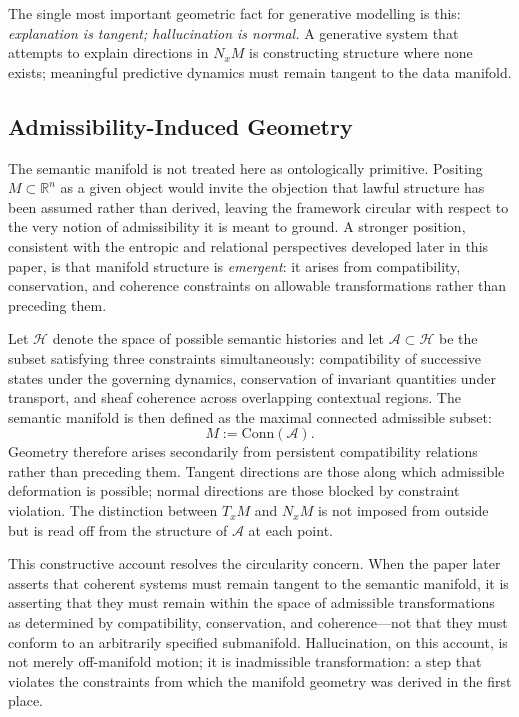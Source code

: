 \documentclass[11pt,a4paper,twocolumn]{article}
\begin{document}
\medskip
\noindent The single most important geometric fact for generative modelling is
this: \emph{explanation is tangent; hallucination is normal.} A
generative system that attempts to explain directions in $N_x M$ is
constructing structure where none exists; meaningful predictive dynamics
must remain tangent to the data manifold.

\subsection{Admissibility-Induced Geometry}

The semantic manifold is not treated here as ontologically primitive.
Positing $M \subset \mathbb{R}^n$ as a given object would invite the
objection that lawful structure has been assumed rather than derived,
leaving the framework circular with respect to the very notion of
admissibility it is meant to ground. A stronger position, consistent
with the entropic and relational perspectives developed later in this
paper, is that manifold structure is \emph{emergent}: it arises from
compatibility, conservation, and coherence constraints on allowable
transformations rather than preceding them.

Let $\mathcal{H}$ denote the space of possible semantic histories and
let $\mathcal{A} \subset \mathcal{H}$ be the subset satisfying
three constraints simultaneously: compatibility of successive states
under the governing dynamics, conservation of invariant quantities
under transport, and sheaf coherence across overlapping contextual
regions. The semantic manifold is then defined as the maximal
connected admissible subset:
\[
M := \mathrm{Conn}(\mathcal{A}).
\]
Geometry therefore arises secondarily from persistent compatibility
relations rather than preceding them. Tangent directions are those
along which admissible deformation is possible; normal directions are
those blocked by constraint violation. The distinction between
$T_x M$ and $N_x M$ is not imposed from outside but is read off
from the structure of $\mathcal{A}$ at each point.

This constructive account resolves the circularity concern. When the
paper later asserts that coherent systems must remain tangent to the
semantic manifold, it is asserting that they must remain within the
space of admissible transformations as determined by compatibility,
conservation, and coherence---not that they must conform to an
arbitrarily specified submanifold. Hallucination, on this account,
is not merely off-manifold motion; it is inadmissible transformation:
a step that violates the constraints from which the manifold geometry
was derived in the first place.
\end{document}
